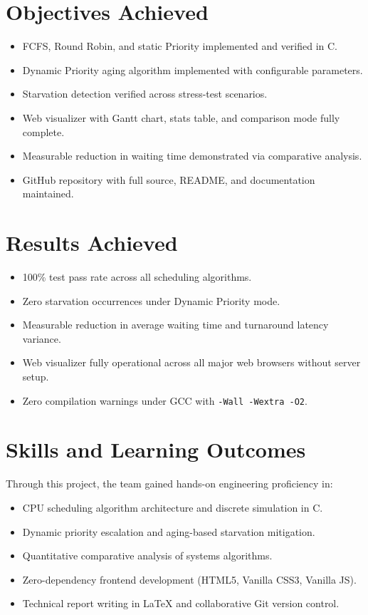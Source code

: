 \documentclass[12pt,a4paper]{report}
\begin{document}
\section{Objectives Achieved}
\begin{itemize}[leftmargin=1.5em, itemsep=2pt]
  \item FCFS, Round Robin, and static Priority implemented and verified in C.
  \item Dynamic Priority aging algorithm implemented with configurable parameters.
  \item Starvation detection verified across stress-test scenarios.
  \item Web visualizer with Gantt chart, stats table, and comparison mode fully complete.
  \item Measurable reduction in waiting time demonstrated via comparative analysis.
  \item GitHub repository with full source, README, and documentation maintained.
\end{itemize}

\section{Results Achieved}
\begin{itemize}[leftmargin=1.5em, itemsep=2pt]
  \item 100\% test pass rate across all scheduling algorithms.
  \item Zero starvation occurrences under Dynamic Priority mode.
  \item Measurable reduction in average waiting time and turnaround latency variance.
  \item Web visualizer fully operational across all major web browsers without server setup.
  \item Zero compilation warnings under GCC with \texttt{-Wall -Wextra -O2}.
\end{itemize}

\section{Skills and Learning Outcomes}
Through this project, the team gained hands-on engineering proficiency in:
\begin{itemize}[leftmargin=1.5em, itemsep=2pt]
  \item CPU scheduling algorithm architecture and discrete simulation in C.
  \item Dynamic priority escalation and aging-based starvation mitigation.
  \item Quantitative comparative analysis of systems algorithms.
  \item Zero-dependency frontend development (HTML5, Vanilla CSS3, Vanilla JS).
  \item Technical report writing in LaTeX and collaborative Git version control.
\end{itemize}
\end{document}
